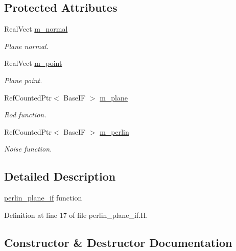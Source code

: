 \subsection*{Protected Attributes}
\begin{DoxyCompactItemize}
\item 
Real\+Vect \hyperlink{classperlin__plane__if_a35d283c8c3cb07e7b78788d234745ebe}{m\+\_\+normal}
\begin{DoxyCompactList}\small\item\em Plane normal. \end{DoxyCompactList}\item 
Real\+Vect \hyperlink{classperlin__plane__if_a4c4c709480400dfeb56349b1d61c8dc1}{m\+\_\+point}
\begin{DoxyCompactList}\small\item\em Plane point. \end{DoxyCompactList}\item 
Ref\+Counted\+Ptr$<$ Base\+IF $>$ \hyperlink{classperlin__plane__if_acf956bcf505763e786323ca39b9810b8}{m\+\_\+plane}
\begin{DoxyCompactList}\small\item\em Rod function. \end{DoxyCompactList}\item 
Ref\+Counted\+Ptr$<$ Base\+IF $>$ \hyperlink{classperlin__plane__if_af9c92f660c0be22a146e0dd6da16ae82}{m\+\_\+perlin}
\begin{DoxyCompactList}\small\item\em Noise function. \end{DoxyCompactList}\end{DoxyCompactItemize}


\subsection{Detailed Description}
\hyperlink{classperlin__plane__if}{perlin\+\_\+plane\+\_\+if} function 

Definition at line 17 of file perlin\+\_\+plane\+\_\+if.\+H.



\subsection{Constructor \& Destructor Documentation}
